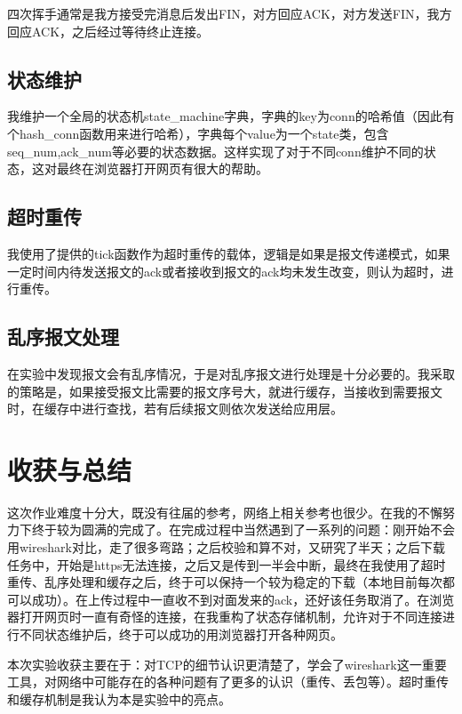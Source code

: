 \documentclass[lang=cn,a4paper]{elegantpaper}
\begin{document}
四次挥手通常是我方接受完消息后发出FIN，对方回应ACK，对方发送FIN，我方回应ACK，之后经过等待终止连接。

\subsection{状态维护}

我维护一个全局的状态机state\_machine字典，字典的key为conn的哈希值（因此有个hash\_conn函数用来进行哈希），字典每个value为一个state类，包含seq\_num,ack\_num等必要的状态数据。这样实现了对于不同conn维护不同的状态，这对最终在浏览器打开网页有很大的帮助。

\subsection{超时重传}

我使用了提供的tick函数作为超时重传的载体，逻辑是如果是报文传递模式，如果一定时间内待发送报文的ack或者接收到报文的ack均未发生改变，则认为超时，进行重传。

\subsection{乱序报文处理}

在实验中发现报文会有乱序情况，于是对乱序报文进行处理是十分必要的。我采取的策略是，如果接受报文比需要的报文序号大，就进行缓存，当接收到需要报文时，在缓存中进行查找，若有后续报文则依次发送给应用层。




\section{收获与总结}

这次作业难度十分大，既没有往届的参考，网络上相关参考也很少。在我的不懈努力下终于较为圆满的完成了。在完成过程中当然遇到了一系列的问题：刚开始不会用wireshark对比，走了很多弯路；之后校验和算不对，又研究了半天；之后下载任务中，开始是https无法连接，之后又是传到一半会中断，最终在我使用了超时重传、乱序处理和缓存之后，终于可以保持一个较为稳定的下载（本地目前每次都可以成功）。在上传过程中一直收不到对面发来的ack，还好该任务取消了。在浏览器打开网页时一直有奇怪的连接，在我重构了状态存储机制，允许对于不同连接进行不同状态维护后，终于可以成功的用浏览器打开各种网页。

本次实验收获主要在于：对TCP的细节认识更清楚了，学会了wireshark这一重要工具，对网络中可能存在的各种问题有了更多的认识（重传、丢包等）。超时重传和缓存机制是我认为本是实验中的亮点。
\end{document}
